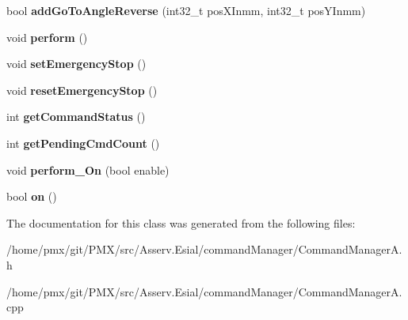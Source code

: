 \begin{DoxyCompactItemize}
bool {\bfseries add\+Go\+To\+Angle\+Reverse} (int32\+\_\+t pos\+X\+Inmm, int32\+\_\+t pos\+Y\+Inmm)
\item 
\mbox{\label{classCommandManagerA_a5a1c89032b7f8150bed910011daf111a}} 
void {\bfseries perform} ()
\item 
\mbox{\label{classCommandManagerA_a7ce3c37b6130dd468a93a658f4b3aced}} 
void {\bfseries set\+Emergency\+Stop} ()
\item 
\mbox{\label{classCommandManagerA_a15e1210241f2dd30047f151994e68692}} 
void {\bfseries reset\+Emergency\+Stop} ()
\item 
\mbox{\label{classCommandManagerA_a3d4499244b1f7548c0889974a16b402b}} 
int {\bfseries get\+Command\+Status} ()
\item 
\mbox{\label{classCommandManagerA_af99a7d9c7222cab61527a8acee9b54ee}} 
int {\bfseries get\+Pending\+Cmd\+Count} ()
\item 
\mbox{\label{classCommandManagerA_ae485a84b4549ea2cd01e1687febcebe7}} 
void {\bfseries perform\+\_\+\+On} (bool enable)
\item 
\mbox{\label{classCommandManagerA_a0de0b0db2a9ac94ad0f47ca705c3f381}} 
bool {\bfseries on} ()
\end{DoxyCompactItemize}


The documentation for this class was generated from the following files\+:\begin{DoxyCompactItemize}
\item 
/home/pmx/git/\+P\+M\+X/src/\+Asserv.\+Esial/command\+Manager/Command\+Manager\+A.\+h\item 
/home/pmx/git/\+P\+M\+X/src/\+Asserv.\+Esial/command\+Manager/Command\+Manager\+A.\+cpp\end{DoxyCompactItemize}
